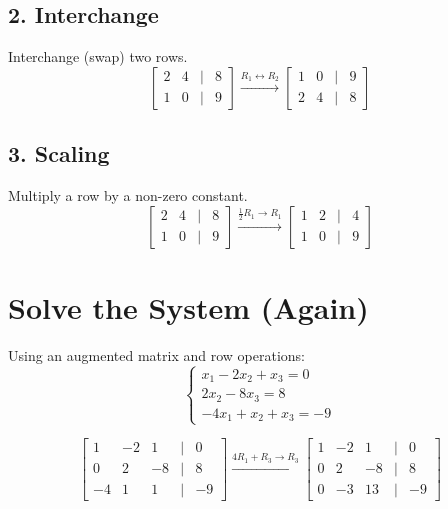 \documentclass{article}
\begin{document}
\subsection*{2. Interchange}
Interchange (swap) two rows.
\vspace{0.5em}
\[
\begin{bmatrix}
2 & 4 & | & 8 \\
1 & 0 & | & 9
\end{bmatrix}
\xrightarrow{R_1 \leftrightarrow R_2}
\begin{bmatrix}
1 & 0 & | & 9 \\
2 & 4 & | & 8
\end{bmatrix}
\]
\vspace{2em}

\subsection*{3. Scaling}
Multiply a row by a non-zero constant.
\vspace{0.5em}
\[
\begin{bmatrix}
2 & 4 & | & 8 \\
1 & 0 & | & 9
\end{bmatrix}
\xrightarrow{\frac{1}{2}R_1 \rightarrow R_1}
\begin{bmatrix}
1 & 2 & | & 4 \\
1 & 0 & | & 9
\end{bmatrix}
\]
\vspace{2em}

\section*{Solve the System (Again)}
\vspace{0.5em}
Using an augmented matrix and row operations:
\vspace{0.5em}
\[
\begin{cases}
x_1 - 2x_2 + x_3 = 0 \\
2x_2 - 8x_3 = 8 \\
-4x_1 + x_2 + x_3 = -9
\end{cases}
\]
\vspace{1em}

\[
\begin{bmatrix}
1 & -2 & 1 & | & 0 \\
0 & 2 & -8 & | & 8 \\
-4 & 1 & 1 & | & -9
\end{bmatrix}
\xrightarrow{4R_1 + R_3 \rightarrow R_3}
\begin{bmatrix}
1 & -2 & 1 & | & 0 \\
0 & 2 & -8 & | & 8 \\
0 & -3 & 13 & | & -9
\end{bmatrix}
\]
\vspace{1em}
\end{document}
